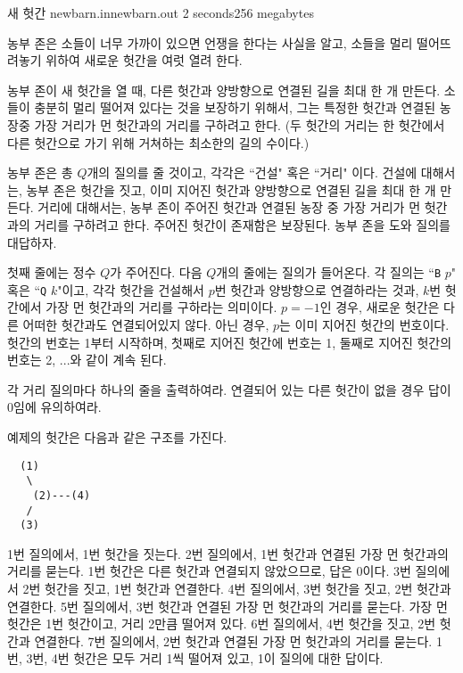 \begin{problem}{새 헛간}
	{newbarn.in}{newbarn.out}
	{2 seconds}{256 megabytes}{}

	농부 존은 소들이 너무 가까이 있으면 언쟁을 한다는 사실을 알고, 소들을 멀리 떨어뜨려놓기 위하여 새로운 헛간을 여럿 열려 한다.
	
	농부 존이 새 헛간을 열 때, 다른 헛간과 양방향으로 연결된 길을 최대 한 개 만든다. 소들이 충분히 멀리 떨어져 있다는 것을 보장하기 위해서, 그는 특정한 헛간과 연결된 농장중 가장 거리가 먼 헛간과의 거리를 구하려고 한다. (두 헛간의 거리는 한 헛간에서 다른 헛간으로 가기 위해 거쳐하는 최소한의 길의 수이다.)
	
	농부 존은 총 $Q$개의 질의를 줄 것이고, 각각은 ``건설" 혹은 ``거리" 이다. 건설에 대해서는, 농부 존은 헛간을 짓고, 이미 지어진 헛간과 양방향으로 연결된 길을 최대 한 개 만든다. 거리에 대해서는, 농부 존이 주어진 헛간과 연결된 농장 중 가장 거리가 먼 헛간과의 거리를 구하려고 한다. 주어진 헛간이 존재함은 보장된다. 농부 존을 도와 질의를 대답하자.
	
	
	\InputFile
	
	첫째 줄에는 정수 $Q$가 주어진다. 다음 $Q$개의 줄에는 질의가 들어온다. 각 질의는 ``\texttt{B} $p$" 혹은 ``\texttt{Q} $k$"이고, 각각 헛간을 건설해서 $p$번 헛간과 양방향으로 연결하라는 것과, $k$번 헛간에서 가장 먼 헛간과의 거리를 구하라는 의미이다. $p=-1$인 경우, 새로운 헛간은 다른 어떠한 헛간과도 연결되어있지 않다. 아닌 경우, $p$는 이미 지어진 헛간의 번호이다. 헛간의 번호는 1부터 시작하며, 첫째로 지어진 헛간에 번호는 1, 둘째로 지어진 헛간의 번호는 2, ...와 같이 계속 된다.
	
	\OutputFile
	
	각 거리 질의마다 하나의 줄을 출력하여라. 연결되어 있는 다른 헛간이 없을 경우 답이 0임에 유의하여라.
	
	
	\Examples
	
	\begin{example}
	\end{example}

	\Note
	
	예제의 헛간은 다음과 같은 구조를 가진다.
	
	\begin{verbatim}
  (1) 
   \   
    (2)---(4)
   /
  (3)	
	\end{verbatim}
	
	1번 질의에서, 1번 헛간을 짓는다. 2번 질의에서, 1번 헛간과 연결된 가장 먼 헛간과의 거리를 묻는다. 1번 헛간은 다른 헛간과 연결되지 않았으므로, 답은 0이다. 3번 질의에서 2번 헛간을 짓고, 1번 헛간과 연결한다. 4번 질의에서, 3번 헛간을 짓고, 2번 헛간과 연결한다. 5번 질의에서, 3번 헛간과 연결된 가장 먼 헛간과의 거리를 묻는다. 가장 먼 헛간은 1번 헛간이고, 거리 2만큼 떨어져 있다. 6번 질의에서, 4번 헛간을 짓고, 2번 헛간과 연결한다. 7번 질의에서, 2번 헛간과 연결된 가장 먼 헛간과의 거리를 묻는다. 1번, 3번, 4번 헛간은 모두 거리 1씩 떨어져 있고, 1이 질의에 대한 답이다.
	
	
\end{problem}

